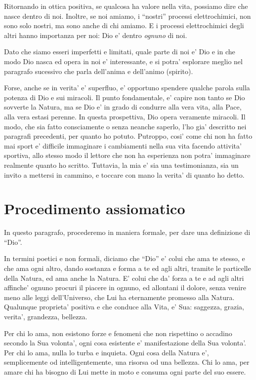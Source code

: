 Ritornando in ottica positiva, se qualcosa ha valore nella vita, possiamo dire che nasce dentro di noi. Inoltre, se noi amiamo, i ``nostri'' processi elettrochimici, non sono solo nostri, ma sono anche di chi amiamo. E i processi elettrochimici degli altri hanno importanza per noi: Dio e' dentro \emph{ognuno} di noi.

Dato che siamo esseri imperfetti e limitati, quale parte di noi e' Dio e in che modo Dio nasca ed opera in noi e' interessante, e si potra' esplorare meglio nel paragrafo sucessivo che parla dell'anima e dell'animo (spirito).

Forse, anche se in verita' e' superfluo, e' opportuno spendere qualche parola sulla potenza di Dio e sui miracoli. Il punto fondamentale, e' capire non tanto se Dio sovverte la Natura, ma se Dio e' in grado di condurre alla vera vita, alla Pace, alla vera estasi perenne. In questa prospettiva, Dio opera veramente miracoli. Il modo, che sia fatto consciamente o senza neanche saperlo, l'ho gia' descritto nei paragrafi precedenti, per quanto ho potuto. Putroppo, cosi' come chi non ha fatto mai sport e' difficile immaginare i cambiamenti nella sua vita facendo attivita' sportiva, allo stesso modo il lettore che non ha esperienza non potra' immaginare realmente quanto ho scritto. Tuttavia, la mia e' sia una testimonianza, sia un invito a mettersi in cammino, e toccare con mano la verita' di quanto ho detto.

\section{Procedimento assiomatico}
\label{procAx}

In questo paragrafo, procederemo in maniera formale, per dare una definizione di ``Dio''.

In termini poetici e non formali, diciamo che ``Dio'' e' colui che ama te stesso, e che ama ogni altro, dando sostanza e forma a te ed agli altri, tramite le particelle della Natura, ed ama anche la Natura. E' colui che da' forza a te e ad agli altri affinche' ognuno procuri il piacere in ognuno, ed allontani il dolore, senza venire meno alle leggi dell'Universo, che Lui ha eternamente promesso alla Natura. Qualunque proprieta' positiva e che conduce alla Vita, e' Sua: saggezza, grazia, verita', grandezza, bellezza.

Per chi lo ama, non esistono forze e fenomeni che non rispettino o accadino secondo la Sua volonta', ogni cosa esistente e' manifestazione della Sua volonta'. Per chi lo ama, nulla lo turba e inquieta. Ogni cosa della Natura e', semplicemente od intelligentemente, una risorsa od una bellezza. Chi lo ama, per amare chi ha bisogno di Lui mette in moto e consuma ogni parte del suo essere.

